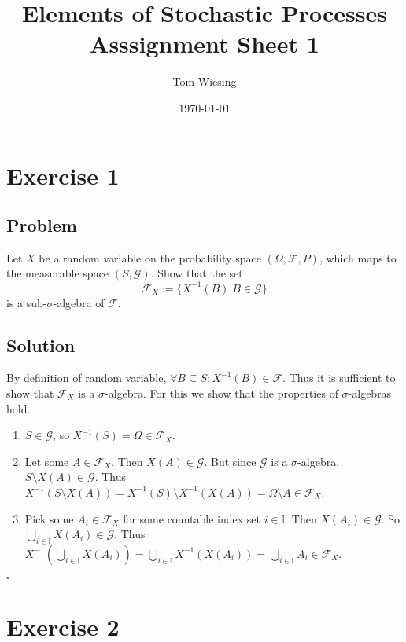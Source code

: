 \documentclass[a4paper,10pt]{article}
\title{Elements of Stochastic Processes\\Asssignment Sheet 1}
\author{Tom Wiesing}
\date{\today}
\begin{document}
\maketitle

\section{Exercise 1}

\subsection{Problem}

Let $X$ be a random variable on the probability space $(\Omega,\mathcal{F},P)$, which maps to
the measurable space $(S,\mathcal{G})$. Show that the set
\[
  \mathcal{F}_X := \{X^{-1} (B) | B \in \mathcal{G}\}
\]
is a sub-$\sigma$-algebra of $\mathcal{F}$.

\subsection{Solution}

By definition of random variable, $\forall B \subseteq S : { X^{-1} (B) \in \mathcal{F}}$. Thus it is sufficient to show that $\mathcal{F}_X$ is a $\sigma$-algebra. For this we show that the properties of $\sigma$-algebras hold.

\begin{enumerate}
  \item $S \in \mathcal{G}$, so $X^{-1}(S) = \Omega \in \mathcal{F}_X$.
  \item
    Let some $A \in \mathcal{F}_X$. Then $X(A) \in \mathcal{G}$.
    But since $\mathcal{G}$ is a $\sigma$-algebra, $S \setminus X(A) \in \mathcal{G}$.
    Thus $X^{-1} (S \setminus X(A)) = X^{-1}(S) \setminus X^{-1}(X(A)) = \Omega \setminus A \in \mathcal{F}_X$.
  \item
    Pick some $A_i \in \mathcal{F}_X$ for some countable index set $i \in \mathbb{I}$.
    Then $X(A_i) \in \mathcal{G}$. So $\bigcup_{i \in \mathbb{I}}{X(A_i)} \in \mathcal{G}$.
    Thus $X^{-1}(\bigcup_{i \in \mathbb{I}}{X(A_i)}) = \bigcup_{i \in \mathbb{I}}{X^{-1}(X(A_i))} = \bigcup_{i \in \mathbb{I}}{A_i} \in \mathcal{F}_X$.
\end{enumerate}

{\raggedleft{}$\square$}

\section{Exercise 2}
\end{document}
